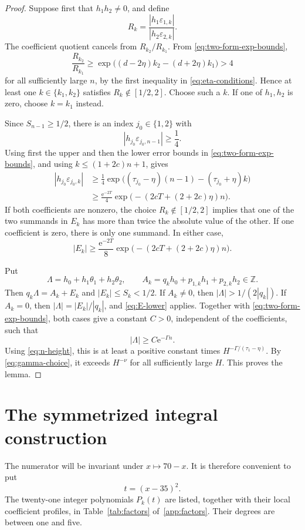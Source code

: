 \documentclass[preprint,12pt]{elsarticle}
\theoremstyle{definition}
\newcommand{\Z}{\mathbb Z}
\newcommand{\e}{\mathrm e}
\newcommand{\eps}{\varepsilon}
\begin{document}
\begin{proof}
Suppose first that $h_1h_2\ne0$, and define
\[
 R_k=\frac{|h_1\eps_{1,k}|}{|h_2\eps_{2,k}|}.
\]
The coefficient quotient cancels from $R_{k_2}/R_{k_1}$.  From
\eqref{eq:two-form-exp-bounds},
\[
 \frac{R_{k_2}}{R_{k_1}}
 \ge
 \exp\!\bigl((d-2\eta)k_2-(d+2\eta)k_1\bigr)>4
\]
for all sufficiently large $n$, by the first inequality in
\eqref{eq:eta-conditions}.  Hence at least one
$k\in\{k_1,k_2\}$ satisfies
$R_k\notin[1/2,2]$.  Choose such a $k$.  If one of $h_1,h_2$ is zero,
choose $k=k_1$ instead.

Since $S_{n-1}\ge1/2$, there is an index $j_0\in\{1,2\}$ with
\[
 |h_{j_0}\eps_{j_0,n-1}|\ge\frac14.
\]
Using first the upper and then the lower error bounds in
\eqref{eq:two-form-exp-bounds}, and using
$k\le(1+2c)n+1$, gives
\begin{align*}
 |h_{j_0}\eps_{j_0,k}|
 &\ge\frac14
 \exp\!\bigl((\tau_{j_0}-\eta)(n-1)
             -(\tau_{j_0}+\eta)k\bigr)\\
 &\ge\frac{\e^{-2T}}4
 \exp\!\bigl(-(2cT+(2+2c)\eta)n\bigr).
\end{align*}
If both coefficients are nonzero, the choice
$R_k\notin[1/2,2]$ implies that one of the two summands in $E_k$ has
more than twice the absolute value of the other.  If one coefficient is zero,
there is only one summand.  In either case,
\begin{equation}\label{eq:E-lower}
 |E_k|\ge\frac{\e^{-2T}}8
 \exp\!\bigl(-(2cT+(2+2c)\eta)n\bigr).
\end{equation}

Put
\[
 \Lambda=h_0+h_1\theta_1+h_2\theta_2,
 \qquad
 A_k=q_k h_0+p_{1,k}h_1+p_{2,k}h_2\in\Z.
\]
Then $q_k\Lambda=A_k+E_k$ and $|E_k|\le S_k<1/2$.
If $A_k\ne0$, then
$|\Lambda|>1/(2|q_k|)$.  If $A_k=0$, then
$|\Lambda|=|E_k|/|q_k|$, and \eqref{eq:E-lower} applies.
Together with \eqref{eq:two-form-exp-bounds}, both cases give a constant
$C>0$, independent of the coefficients, such that
\[
 |\Lambda|\ge C\e^{-\Gamma n}.
\]
Using \eqref{eq:n-height}, this is at least a positive constant times
$H^{-\Gamma/(\tau_1-\eta)}$.  By \eqref{eq:gamma-choice}, it exceeds
$H^{-\nu}$ for all sufficiently large $H$.  This proves the lemma.
\end{proof}

\section{The symmetrized integral construction}
\label{sec:construction}

The numerator will be invariant under $x\mapsto70-x$.  It is therefore
convenient to put
\[
 t=(x-35)^2.
\]
The twenty-one integer polynomials $P_k(t)$ are listed, together with their
local coefficient profiles, in Table~\ref{tab:factors} of~\ref{app:factors}.
Their degrees are between one and five.
\end{document}
